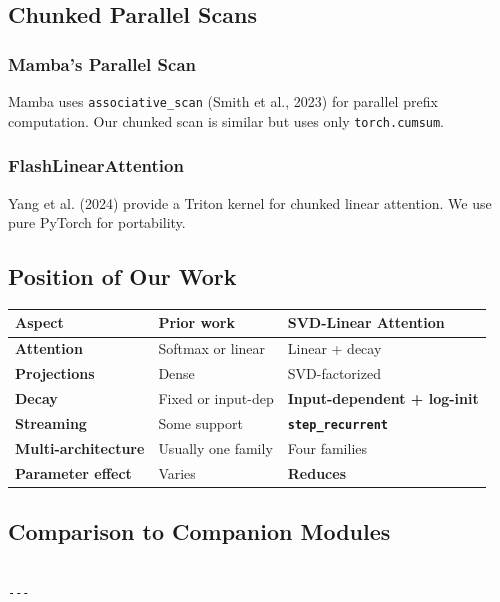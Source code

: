 \subsection{Chunked Parallel Scans}

\subsubsection{Mamba's Parallel Scan}

Mamba uses \texttt{associative\_scan} (Smith et al., 2023) for parallel prefix 
computation. Our chunked scan is similar but uses only \texttt{torch.cumsum}.

\subsubsection{FlashLinearAttention}

Yang et al. (2024) provide a Triton kernel for chunked linear attention. 
We use pure PyTorch for portability.

\subsection{Position of Our Work}

\begin{table}[H]
\centering
\small
\begin{tabular}{lll}
\toprule
\textbf{Aspect} & \textbf{Prior work} & \textbf{SVD-Linear Attention} \\
\midrule
\textbf{Attention} & Softmax or linear & Linear + decay \\
\textbf{Projections} & Dense & SVD-factorized \\
\textbf{Decay} & Fixed or input-dep & \textbf{Input-dependent + log-init} \\
\textbf{Streaming} & Some support & \textbf{\texttt{step\_recurrent}} \\
\textbf{Multi-architecture} & Usually one family & Four families \\
\textbf{Parameter effect} & Varies & \textbf{Reduces} \\
\bottomrule
\end{tabular}
\end{table}

\subsection{Comparison to Companion Modules}

\begin{lstlisting}

---
\end{lstlisting}